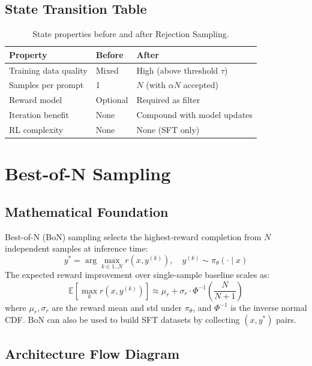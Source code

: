 \subsection{State Transition Table}
\begin{table}[h]\centering
\begin{tabular}{lll}\toprule
\textbf{Property} & \textbf{Before} & \textbf{After}\\\midrule
Training data quality & Mixed & High (above threshold $\tau$)\\
Samples per prompt & 1 & $N$ (with $\alpha N$ accepted)\\
Reward model & Optional & Required as filter\\
Iteration benefit & None & Compound with model updates\\
RL complexity & None & None (SFT only)\\\bottomrule
\end{tabular}
\caption{State properties before and after Rejection Sampling.}
\end{table}

\newpage
\section{Best-of-N Sampling}

\subsection{Mathematical Foundation}
Best-of-N (BoN) sampling selects the highest-reward completion from $N$ independent samples at inference time:
\begin{equation}
  y^* = \arg\max_{k \in 1..N} r(x, y^{(k)}),\quad y^{(k)} \sim \pi_\theta(\cdot \mid x)
\end{equation}
The expected reward improvement over single-sample baseline scales as:
\begin{equation}
  \mathbb{E}[\max_k r(x,y^{(k)})] \approx \mu_r + \sigma_r \cdot \Phi^{-1}\!\left(\frac{N}{N+1}\right)
\end{equation}
where $\mu_r, \sigma_r$ are the reward mean and std under $\pi_\theta$, and $\Phi^{-1}$ is the inverse normal CDF. BoN can also be used to build SFT datasets by collecting $(x, y^*)$ pairs.

\subsection{Architecture Flow Diagram}


